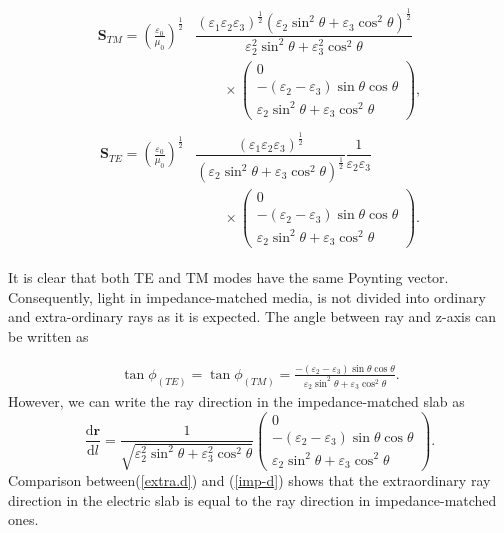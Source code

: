 \documentclass[9pt,twocolumn,twoside]{osajnl}
\begin{document}
\begin{align}\label{s}
\begin{split}
  \mathbf{S}_{TM}=\left(\frac{\varepsilon_{0}}{\mu_{0}}\right)^{\frac{1}{2}}&\dfrac{(\varepsilon_{1}\varepsilon_{2}\varepsilon_{3})^{\frac{1}{2}}({\varepsilon_{2}\sin^{2}{\theta}+\varepsilon_{3}\cos^{2}{\theta}})^{\frac{1}{2}}}{\varepsilon_{2}^{2} \sin^{2}{\theta} + \varepsilon_{3}^{2}\cos^{2}{\theta}}
\\& \qquad\times
 \begin{pmatrix}
 0\\ -(\varepsilon_{2}-\varepsilon_{3})\sin{\theta}\cos{\theta}  \\  \varepsilon_{2} \sin^{2}{\theta} + \varepsilon_{3}\cos^{2}{\theta}
 \end{pmatrix},
 \end{split}
 \end{align}
\begin{align}\label{p.v 2}
\begin{split}
\mathbf{S}_{TE}=\left(\frac{\varepsilon_{0}}{\mu_{0}}\right)^{\frac{1}{2}}&\dfrac{(\varepsilon_{1}\varepsilon_{2}\varepsilon_{3})^{\frac{1}{2}}}{({\varepsilon_{2}\sin^{2}{\theta}+\varepsilon_{3}\cos^{2}{\theta}})^{\frac{1}{2}}}\dfrac{1}{\varepsilon_{2}\varepsilon_{3}}
\\ &\qquad\times
\begin{pmatrix}
 0 \\ -(\varepsilon_{2}-\varepsilon_{3})\sin\theta\cos\theta \\   \varepsilon_{2} \sin^{2}\theta + \varepsilon_{3}\cos^{2}\theta
 \end{pmatrix}.
 \end{split}
\end{align}

It is clear that both TE and TM modes have the same Poynting vector. Consequently, light in impedance-matched media, is not divided into ordinary and extra-ordinary rays as it is expected.
The angle between ray and z-axis can be written as

\begin{align}\label{tanp}
\tan{\phi}_{(TE)}=\tan{\phi}_{(TM)}=\frac{-(\varepsilon_{2}-\varepsilon_{3})\sin{\theta}\cos{\theta}}{\varepsilon_{2} \sin^{2}{\theta} + \varepsilon_{3}\cos^{2}{\theta}}.
\end{align}
However, we can write the ray direction in the impedance-matched slab as 
\begin{equation}\label{imp-d}
\dfrac{\mathbf{\mathrm{d}{r}}}{\mathrm{d}{l}}=\dfrac{1}{\sqrt{\varepsilon_{2}^{2} \sin^{2}{\theta} + \varepsilon_{3}^{2}\cos^{2}{\theta}}}
 \begin{pmatrix}
 0\\ -(\varepsilon_{2}-\varepsilon_{3})\sin{\theta}\cos{\theta}  \\  \varepsilon_{2} \sin^{2}{\theta} + \varepsilon_{3}\cos^{2}{\theta}
 \end{pmatrix}.
\end{equation}
Comparison between(\ref{extra.d}) and (\ref{imp-d}) shows that  the extraordinary ray direction in the electric slab is equal to the ray direction in impedance-matched ones.
\end{document}
